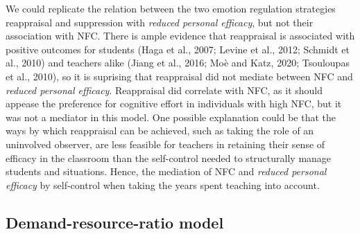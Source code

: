 \documentclass[
  english,
  man,floatsintext]{apa6}
\begin{document}
We could replicate the relation between the two emotion regulation strategies reappraisal and suppression with \emph{reduced personal efficacy}, but not their association with NFC.
There is ample evidence that reappraisal is associated with positive outcomes for students (Haga et al., 2007; Levine et al., 2012; Schmidt et al., 2010) and teachers alike (Jiang et al., 2016; Moè and Katz, 2020; Tsouloupas et al., 2010), so it is suprising that reappraisal did not mediate between NFC and \emph{reduced personal efficacy}.
Reappraisal did correlate with NFC, as it should appease the preference for cognitive effort in individuals with high NFC, but it was not a mediator in this model.
One possible explanation could be that the ways by which reappraisal can be achieved, such as taking the role of an uninvolved observer, are less feasible for teachers in retaining their sense of efficacy in the classroom than the self-control needed to structurally manage students and situations.
Hence, the mediation of NFC and \emph{reduced personal efficacy} by self-control when taking the years spent teaching into account.

\hypertarget{demand-resource-ratio-model-1}{%
\subsection{Demand-resource-ratio model}\label{demand-resource-ratio-model-1}}
\end{document}
